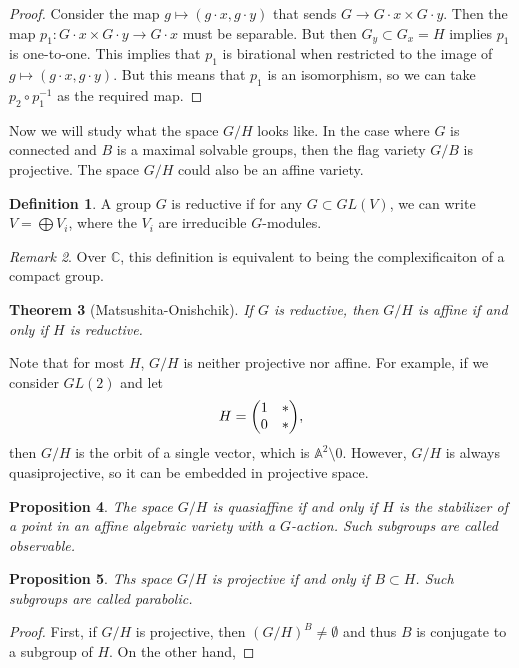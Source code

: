 \documentclass[leqno, openany]{memoir}
\newtheorem{thm}{Theorem}[section]
\newtheorem{prop}[thm]{Proposition}
\theoremstyle{definition}
\newtheorem{defn}[thm]{Definition}
\theoremstyle{remark}
\newtheorem{rmk}[thm]{Remark}
\theoremstyle{plain}
\theoremstyle{definition}
\theoremstyle{remark}
\newcommand{\A}{\mathbb{A}}
\newcommand{\C}{\mathbb{C}}
\begin{document}
\begin{proof} Consider the map $g \mapsto (g \cdot x, g \cdot y)$ that sends $G
    \to G \cdot x \times G \cdot y$. Then the map $p_1 \colon G \cdot x \times
    G \cdot y \to G \cdot x$ must be separable. But then $G_y \subset G_x = H$
    implies $p_1$ is one-to-one. This implies that $p_1$ is birational when
    restricted to the image of $g \mapsto (g \cdot x, g \cdot y)$. But this
    means that $p_1$ is an isomorphism, so we can take $p_2 \circ p_1^{-1}$ as
    the required map.  \end{proof}

Now we will study what the space $G/H$ looks like. In the case where $G$ is
connected and $B$ is a maximal solvable groups, then the flag variety $G/B$ is
projective. The space $G/H$ could also be an affine variety.

\begin{defn} A group $G$ is reductive if for any $G \subset GL(V)$, we can
write $V = \bigoplus V_i$, where the $V_i$ are irreducible $G$-modules.
\end{defn}

\begin{rmk} Over $\C$, this definition is equivalent to being the
complexificaiton of a compact group.  \end{rmk}

\begin{thm}[Matsushita-Onishchik] If $G$ is reductive, then $G/H$ is affine if
and only if $H$ is reductive.  \end{thm}

Note that for most $H$, $G/H$ is neither projective nor affine. For example, if
we consider $GL(2)$ and let \[ H = \mqty(1 & * \\ 0 & *), \] then $G/H$ is the
orbit of a single vector, which is $\A^2 \setminus 0$. However, $G/H$ is always
quasiprojective, so it can be embedded in projective space.

\begin{prop} The space $G/H$ is quasiaffine if and only if $H$ is the
stabilizer of a point in an affine algebraic variety with a $G$-action. Such
subgroups are called \textit{observable}.  \end{prop}

\begin{prop} Ths space $G/H$ is projective if and only if $B \subset H$. Such
subgroups are called \textit{parabolic}.  \end{prop}

\begin{proof} First, if $G/H$ is projective, then ${(G/H)}^B \neq \emptyset$
and thus $B$ is conjugate to a subgroup of $H$. On the other hand, \end{proof}
\end{document}
